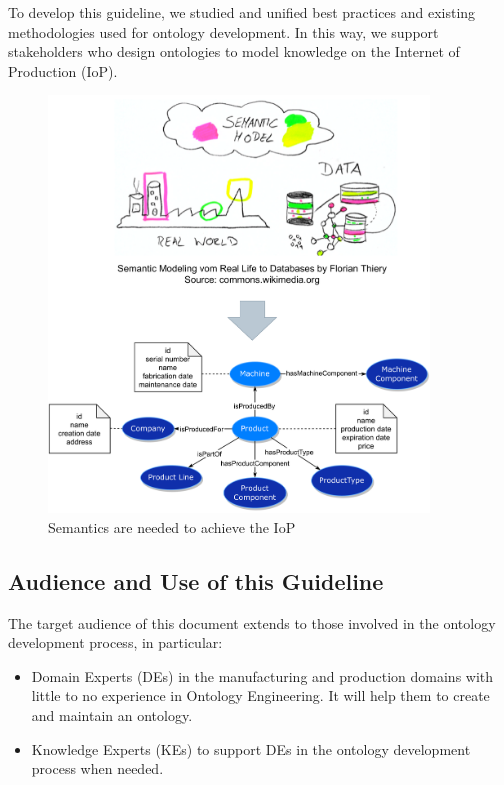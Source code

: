 \documentclass{guideline/sty/rapport}
\begin{document}
To develop this guideline, we studied and unified best practices and existing methodologies used for ontology development. In this way, we support stakeholders who design ontologies to model knowledge on the Internet of Production (\ac{IoP}).

\begin{figure}[H]
        \centering
          \includegraphics[width=0.9\textwidth]{images/semanticmodelabstraction.pdf}
          \caption{Semantics are needed to achieve the IoP}\label{fig:semanticsIoP}
    \end{figure}

\subsection{Audience and Use of this Guideline}
The target audience of this document extends to those involved in the ontology development process, in particular: \singlespacing

\begin{itemize}
    \item Domain Experts (DEs) in the manufacturing and production domains with little to no experience in Ontology Engineering. It will help them to create and maintain an ontology.
    \item Knowledge Experts (KEs) to support \ac{DEs} in the ontology development process when needed.
\end{itemize} \singlespacing
\end{document}
